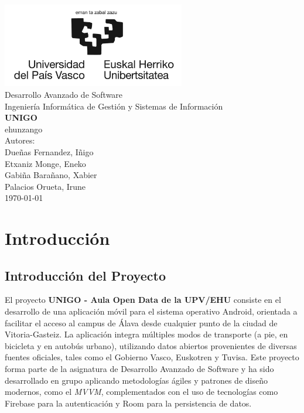 \documentclass[a4paper,12pt]{report}
\begin{document}
  \begin{titlepage}
    \centering
    \includegraphics[width=0.6\textwidth]{../.img/ehuLogoLargo.jpg}\\
    \vspace{1cm}
    \LARGE Desarrollo Avanzado de Software\\
    \vspace{0.5cm}
    \Large Ingeniería Informática de Gestión y Sistemas de Información\\
    \vspace{3cm}
    \vspace{0.5cm}
    \Huge \textbf{UNIGO}\\
    \huge ehunzango\\
    \vspace{2.5cm}
    \Large Autores:\\
    \vspace{0.2cm}
    \large Dueñas Fernandez, Iñigo\\
    \large Etxaniz Monge, Eneko\\
    \large Gabiña Barañano, Xabier\\
    \large Palacios Orueta, Irune\\
    \vfill
    \today
  \end{titlepage}
  \chapter{Introducción}
    \begin{center}
    \end{center}
    \section{Introducción del Proyecto}
      El proyecto \textbf{UNIGO - Aula Open Data de la UPV/EHU} consiste en el desarrollo de una aplicación móvil para el sistema operativo Android, orientada a facilitar el acceso al campus de Álava desde cualquier punto de la ciudad de Vitoria-Gasteiz. La aplicación integra múltiples modos de transporte (a pie, en bicicleta y en autobús urbano), utilizando datos abiertos provenientes de diversas fuentes oficiales, tales como el Gobierno Vasco, Euskotren y Tuvisa. Este proyecto forma parte de la asignatura de Desarrollo Avanzado de Software y ha sido desarrollado en grupo aplicando metodologías ágiles y patrones de diseño modernos, como el \textit{MVVM}, complementados con el uso de tecnologías como Firebase para la autenticación y Room para la persistencia de datos.
\end{document}
